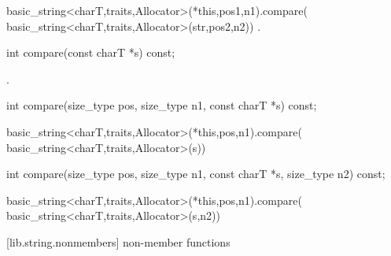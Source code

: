 \begin{itemdescr}
\pnum
\returns
\begin{codeblock}
basic_string<charT,traits,Allocator>(*this,pos1,n1).compare(
             basic_string<charT,traits,Allocator>(str,pos2,n2)) .
\end{codeblock}
\end{itemdescr}

%
%
\begin{itemdecl}
int compare(const charT *s) const;
\end{itemdecl}

\begin{itemdescr}
\pnum
\returns
{}.
\end{itemdescr}

%
%
\begin{itemdecl}
int compare(size_type pos, size_type n1,
            const charT *s) const;
\end{itemdecl}

\begin{itemdescr}
\pnum
\returns
\begin{codeblock}
basic_string<charT,traits,Allocator>(*this,pos,n1).compare(
             basic_string<charT,traits,Allocator>(s))
\end{codeblock}
\end{itemdescr}

%
%
\begin{itemdecl}
int compare(size_type pos, size_type n1,
            const charT *s, size_type n2) const;
\end{itemdecl}

\begin{itemdescr}
\pnum
\returns
\begin{codeblock}
basic_string<charT,traits,Allocator>(*this,pos,n1).compare(
             basic_string<charT,traits,Allocator>(s,n2))
\end{codeblock}
\end{itemdescr}

[lib.string.nonmembers]{ non-member functions}


